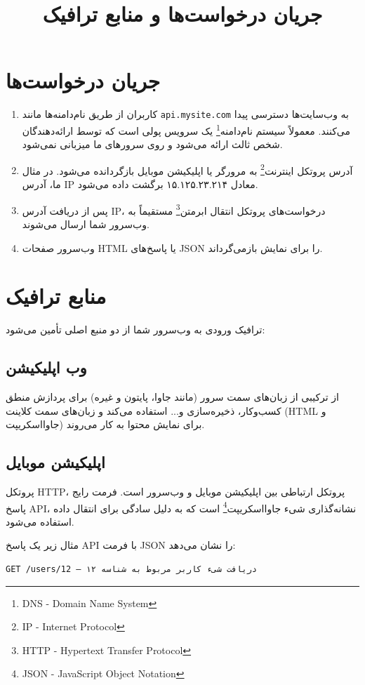 \documentclass[12pt,a4paper]{article}
\title{جریان درخواست‌ها و منابع ترافیک}
\author{}
\date{}
\begin{document}
\maketitle

\section{جریان درخواست‌ها}

\begin{enumerate}
\item کاربران از طریق نام‌دامنه‌ها مانند \texttt{api.mysite.com} به وب‌سایت‌ها دسترسی پیدا می‌کنند. معمولاً سیستم نام‌دامنه\footnote{DNS - Domain Name System} یک سرویس پولی است که توسط ارائه‌دهندگان شخص ثالث ارائه می‌شود و روی سرورهای ما میزبانی نمی‌شود.

\item آدرس پروتکل اینترنت\footnote{IP - Internet Protocol} به مرورگر یا اپلیکیشن موبایل بازگردانده می‌شود. در مثال ما، آدرس IP معادل ۱۵.۱۲۵.۲۳.۲۱۴ برگشت داده می‌شود.

\item پس از دریافت آدرس IP، درخواست‌های پروتکل انتقال ابرمتن\footnote{HTTP - Hypertext Transfer Protocol} مستقیماً به وب‌سرور شما ارسال می‌شوند.

\item وب‌سرور صفحات HTML یا پاسخ‌های JSON را برای نمایش بازمی‌گرداند.
\end{enumerate}

\section{منابع ترافیک}

ترافیک ورودی به وب‌سرور شما از دو منبع اصلی تأمین می‌شود:

\subsection{وب اپلیکیشن}
از ترکیبی از زبان‌های سمت سرور (مانند جاوا، پایتون و غیره) برای پردازش منطق کسب‌وکار، ذخیره‌سازی و... استفاده می‌کند و زبان‌های سمت کلاینت (HTML و جاوااسکریپت) برای نمایش محتوا به کار می‌روند.

\subsection{اپلیکیشن موبایل}
پروتکل HTTP، پروتکل ارتباطی بین اپلیکیشن موبایل و وب‌سرور است. فرمت رایج پاسخ API، نشانه‌گذاری شیء جاوااسکریپت\footnote{JSON - JavaScript Object Notation} است که به دلیل سادگی برای انتقال داده استفاده می‌شود.

مثال زیر یک پاسخ API با فرمت JSON را نشان می‌دهد:

\begin{latin}
\begin{lstlisting}
GET /users/12 – دریافت شیء کاربر مربوط به شناسه ۱۲
\end{lstlisting}
\end{latin}
\end{document}

